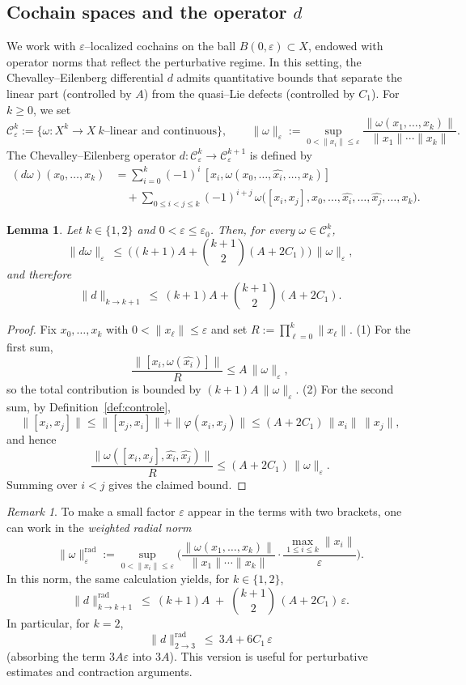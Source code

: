 \documentclass[10pt]{amsart}
\numberwithin{equation}{section}
\newtheorem{lem}[theorem]{Lemma}
\theoremstyle{remark}
\newtheorem{rmk}[theorem]{Remark}
\theoremstyle{definition}
\begin{document}
\subsection{Cochain spaces and the operator $d$}
We work with $\varepsilon$--localized cochains on the ball $B(0,\varepsilon)\subset X$, endowed with operator norms that reflect the perturbative regime.
In this setting, the Chevalley--Eilenberg differential $d$ admits quantitative bounds that separate the linear part (controlled by $A$) from the quasi--Lie defects (controlled by $C_1$).
For $k\ge0$, we set
\[
\mathcal C^k_\varepsilon:=\{\omega:X^k\to X \ \text{$k$--linear and continuous}\},
\qquad
\|\omega\|_{\varepsilon}:=\sup_{0<\|x_i\|\le\varepsilon}
\frac{\|\omega(x_1,\dots,x_k)\|}{\|x_1\|\cdots\|x_k\|}.
\]
The Chevalley--Eilenberg operator $d:\mathcal C^k_\varepsilon\to\mathcal C^{k+1}_\varepsilon$ is defined by
\begin{align*}
(d\omega)(x_0,\dots,x_k)
&=\sum_{i=0}^k(-1)^i\,[x_i,\omega(x_0,\dots,\widehat{x_i},\dots,x_k)]\\
&\quad+\sum_{0\le i<j\le k}(-1)^{i+j}\,\omega\big([x_i,x_j],x_0,\dots,\widehat{x_i},\dots,\widehat{x_j},\dots,x_k\big).
\end{align*}

\begin{lem}\label{lem:dBound}
Let $k\in\{1,2\}$ and $0<\varepsilon\le\varepsilon_0$. Then, for every
$\omega\in\mathcal C^k_\varepsilon$,
\[
\|d\omega\|_\varepsilon
\ \le\ \Big((k+1)A+\binom{k+1}{2}(A+2C_1)\Big)\,\|\omega\|_\varepsilon,
\]
and therefore
\[
\|d\|_{k\to k+1}\ \le\ (k+1)A+\binom{k+1}{2}(A+2C_1).
\]
\end{lem}

\begin{proof}
Fix $x_0,\dots,x_k$ with $0<\|x_\ell\|\le\varepsilon$ and set $R:=\prod_{\ell=0}^k \|x_\ell\|$.
(1) For the first sum,
\[
\frac{\|[x_i,\omega(\widehat{x_i})]\|}{R}\le A\,\|\omega\|_\varepsilon,
\]
so the total contribution is bounded by $(k+1)A\,\|\omega\|_\varepsilon$.
(2) For the second sum, by Definition~\ref{def:controle},
\[
\|[x_i,x_j]\|\le \|[x_j,x_i]\|+\|\varphi(x_i,x_j)\|
\le (A+2C_1)\,\|x_i\|\,\|x_j\|,
\]
and hence
\[
\frac{\|\omega([x_i,x_j],\widehat{x_i},\widehat{x_j})\|}{R}
\le (A+2C_1)\,\|\omega\|_\varepsilon.
\]
Summing over $i<j$ gives the claimed bound.
\end{proof}

\begin{rmk}\label{rmk:radiale}
To make a small factor $\varepsilon$ appear in the terms with two brackets, one
can work in the \emph{weighted radial norm}
\[
\|\omega\|_{\varepsilon}^{\mathrm{rad}}
:=\sup_{0<\|x_i\|\le\varepsilon}
\Bigg(
\frac{\|\omega(x_1,\dots,x_k)\|}{\|x_1\|\cdots\|x_k\|}
\cdot
\frac{\max_{1\le i\le k}\|x_i\|}{\varepsilon}
\Bigg).
\]
In this norm, the same calculation yields, for $k\in\{1,2\}$,
\[
\|d\|^{\mathrm{rad}}_{k\to k+1}
\ \le\ (k+1)A\;+\;\binom{k+1}{2}\,(A+2C_1)\,\varepsilon.
\]
In particular, for $k=2$,
\[
\|d\|^{\mathrm{rad}}_{2\to3}\ \le\ 3A+6C_1\,\varepsilon
\]
(absorbing the term $3A\varepsilon$ into $3A$). This version is useful for perturbative estimates and contraction arguments.
\end{rmk}
\end{document}
